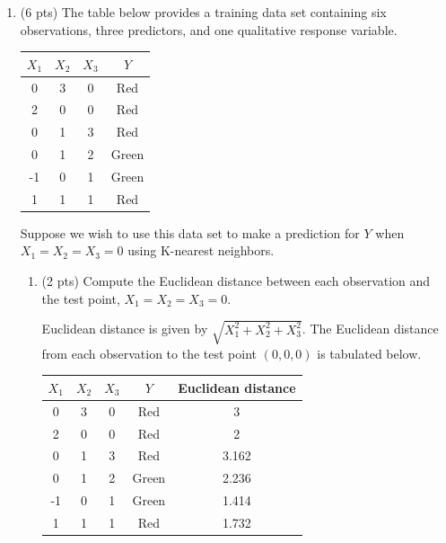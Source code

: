 \documentclass[a4paper]{article}
\theoremstyle{definition}
\newenvironment{soln}{
    \leavevmode\color{blue}\ignorespaces
}{}
\begin{document}
\begin{enumerate}
\begin{enumerate}
\end{enumerate}

\item (6 pts) The table below provides a training data set containing six observations, three predictors, and one qualitative response variable.

\begin{center}
	\begin{tabular}{ c  c  c  c}
		\hline
		$X_{1}$ & $X_{2}$ & $X_{3}$ & $Y$ \\ \hline
		0 & 3 & 0 & Red \\
		2 & 0 & 0 & Red \\
		0 & 1 & 3 & Red \\
		0 & 1 & 2 & Green \\
		-1 & 0 & 1 & Green \\
		1 & 1 & 1 & Red  \\
		\hline
	\end{tabular}
\end{center}

Suppose we wish to use this data set to make a prediction for $Y$ when $X_{1} = X_{2} = X_{3} = 0$ using K-nearest neighbors.

\begin{enumerate}
	\item (2 pts) Compute the Euclidean distance between each observation and the test point, $X_{1} = X_{2} = X_{3}=0$.
 
	\begin{soln}  		Euclidean distance is given by $\sqrt{X_1^2 + X_2^2 + X_3^2}$.
		The Euclidean distance from each observation to the test point $(0,0,0)$ is tabulated below.\\
		\begin{center}
			\begin{tabular}{ c  c  c  c c}
				\hline
				$X_{1}$ & $X_{2}$ & $X_{3}$ & $Y$ & Euclidean distance \\ \hline
				0 & 3 & 0 & Red & 3\\
				2 & 0 & 0 & Red & 2\\
				0 & 1 & 3 & Red & 3.162\\
				0 & 1 & 2 & Green & 2.236\\
				-1 & 0 & 1 & Green & 1.414\\
				1 & 1 & 1 & Red & 1.732\\
				\hline
			\end{tabular}
		\end{center} \end{soln}
 

\end{enumerate}
\end{enumerate}
\end{document}
